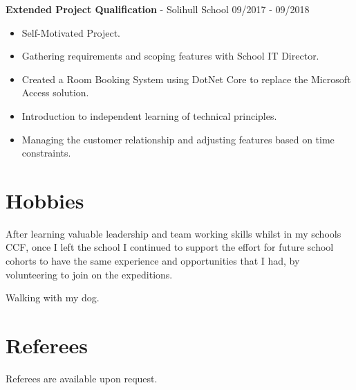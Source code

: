\documentclass{article}
\begin{document}
\textbf{Extended Project Qualification} - Solihull School \hfill 09/2017 - 09/2018

\begin{multicols}{2}
\begin{itemize}
\itemsep0em
	\item Self-Motivated Project.
	\item Gathering requirements and scoping features with School IT Director.
	\item Created a Room Booking System using DotNet Core to replace the Microsoft Access solution.
	\item Introduction to independent learning of technical principles.
	\item Managing the customer relationship and adjusting features based on time constraints.
\end{itemize}
\end{multicols}

\section*{Hobbies}

After learning valuable leadership and team working skills whilst in my schools CCF, once I left the school I continued to support the effort for future school cohorts to have the same experience and opportunities that I had, by volunteering to join on the expeditions.

Walking with my dog.

\section*{Referees}

Referees are available upon request.
\end{document}
